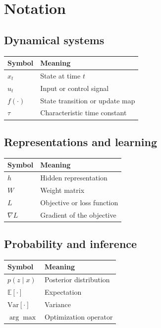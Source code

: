 \section*{Notation}

\subsection*{Dynamical systems}

\begin{tabular}{@{}ll@{}}
  \toprule
  \textbf{Symbol} & \textbf{Meaning} \\
  \midrule
  $x_t$ & State at time $t$ \\
  $u_t$ & Input or control signal \\
  $f(\cdot)$ & State transition or update map \\
  $\tau$ & Characteristic time constant \\
  \bottomrule
\end{tabular}

\subsection*{Representations and learning}

\begin{tabular}{@{}ll@{}}
  \toprule
  \textbf{Symbol} & \textbf{Meaning} \\
  \midrule
  $h$ & Hidden representation \\
  $W$ & Weight matrix \\
  $L$ & Objective or loss function \\
  $\nabla L$ & Gradient of the objective \\
  \bottomrule
\end{tabular}

\subsection*{Probability and inference}

\begin{tabular}{@{}ll@{}}
  \toprule
  \textbf{Symbol} & \textbf{Meaning} \\
  \midrule
  $p(z \mid x)$ & Posterior distribution \\
  $\mathbb{E}[\cdot]$ & Expectation \\
  $\mathrm{Var}[\cdot]$ & Variance \\
  $\arg\max$ & Optimization operator \\
  \bottomrule
\end{tabular}

